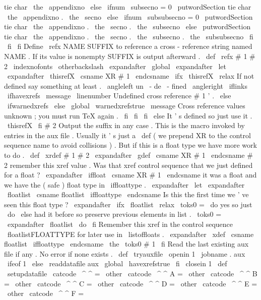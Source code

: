 {{{tie
char
\
the
\
appendixno
{
}
%
\
else
\
ifnum
\
subsecno
=
0
\
putwordSection
tie
char
\
the
\
appendixno
.
\
the
\
secno
\
else
\
ifnum
\
subsubsecno
=
0
\
putwordSection
tie
char
\
the
\
appendixno
.
\
the
\
secno
.
\
the
\
subsecno
\
else
\
putwordSection
tie
char
\
the
\
appendixno
.
\
the
\
secno
.
\
the
\
subsecno
.
\
the
\
subsubsecno
\
fi
\
fi
\
fi
}
%
Define
\
refx
{
NAME
}
{
SUFFIX
}
to
reference
a
cross
-
reference
string
named
NAME
.
%
If
its
value
is
nonempty
SUFFIX
is
output
afterward
.
%
\
def
\
refx
#
1
#
2
{
%
{
%
\
indexnofonts
\
otherbackslash
\
expandafter
\
global
\
expandafter
\
let
\
expandafter
\
thisrefX
\
csname
XR
#
1
\
endcsname
}
%
\
ifx
\
thisrefX
\
relax
%
If
not
defined
say
something
at
least
.
\
angleleft
un
\
-
de
\
-
fined
\
angleright
\
iflinks
\
ifhavexrefs
\
message
{
\
linenumber
Undefined
cross
reference
#
1
'
.
}
%
\
else
\
ifwarnedxrefs
\
else
\
global
\
warnedxrefstrue
\
message
{
Cross
reference
values
unknown
;
you
must
run
TeX
again
.
}
%
\
fi
\
fi
\
fi
\
else
%
It
'
s
defined
so
just
use
it
.
\
thisrefX
\
fi
#
2
%
Output
the
suffix
in
any
case
.
}
%
This
is
the
macro
invoked
by
entries
in
the
aux
file
.
Usually
it
'
s
%
just
a
\
def
(
we
prepend
XR
to
the
control
sequence
name
to
avoid
%
collisions
)
.
But
if
this
is
a
float
type
we
have
more
work
to
do
.
%
\
def
\
xrdef
#
1
#
2
{
%
\
expandafter
\
gdef
\
csname
XR
#
1
\
endcsname
{
#
2
}
%
remember
this
xref
value
.
%
%
Was
that
xref
control
sequence
that
we
just
defined
for
a
float
?
\
expandafter
\
iffloat
\
csname
XR
#
1
\
endcsname
%
it
was
a
float
and
we
have
the
(
safe
)
float
type
in
\
iffloattype
.
\
expandafter
\
let
\
expandafter
\
floatlist
\
csname
floatlist
\
iffloattype
\
endcsname
%
%
Is
this
the
first
time
we
'
ve
seen
this
float
type
?
\
expandafter
\
ifx
\
floatlist
\
relax
\
toks0
=
{
\
do
}
%
yes
so
just
\
do
\
else
%
had
it
before
so
preserve
previous
elements
in
list
.
\
toks0
=
\
expandafter
{
\
floatlist
\
do
}
%
\
fi
%
%
Remember
this
xref
in
the
control
sequence
\
floatlistFLOATTYPE
%
for
later
use
in
\
listoffloats
.
\
expandafter
\
xdef
\
csname
floatlist
\
iffloattype
\
endcsname
{
\
the
\
toks0
{
#
1
}
}
%
\
fi
}
%
Read
the
last
existing
aux
file
if
any
.
No
error
if
none
exists
.
%
\
def
\
tryauxfile
{
%
\
openin
1
\
jobname
.
aux
\
ifeof
1
\
else
\
readdatafile
{
aux
}
%
\
global
\
havexrefstrue
\
fi
\
closein
1
}
\
def
\
setupdatafile
{
%
\
catcode
\
^
^
=
\
other
\
catcode
\
^
^
A
=
\
other
\
catcode
\
^
^
B
=
\
other
\
catcode
\
^
^
C
=
\
other
\
catcode
\
^
^
D
=
\
other
\
catcode
\
^
^
E
=
\
other
\
catcode
\
^
^
F
=
}}}
